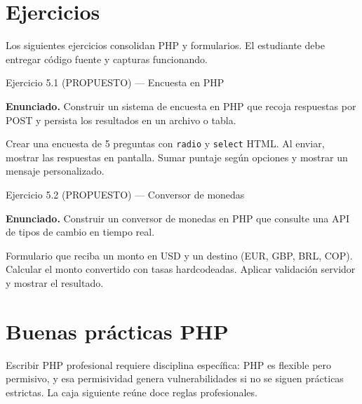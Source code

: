 \documentclass[11pt,a4paper,openany]{book}
\begin{document}
\section{Ejercicios}

Los siguientes ejercicios consolidan PHP y formularios.
El estudiante debe entregar código fuente y capturas funcionando.


\begin{cajaejercicio}{Ejercicio 5.1 (PROPUESTO) --- Encuesta en PHP}


\textbf{Enunciado.} Construir un sistema de encuesta en PHP que recoja respuestas por POST y persista los resultados en un archivo o tabla.

Crear una encuesta de 5 preguntas con \texttt{radio} y \texttt{select}
HTML. Al enviar, mostrar las respuestas en pantalla. Sumar puntaje
según opciones y mostrar un mensaje personalizado.
\end{cajaejercicio}

\begin{cajaejercicio}{Ejercicio 5.2 (PROPUESTO) --- Conversor de monedas}


\textbf{Enunciado.} Construir un conversor de monedas en PHP que consulte una API de tipos de cambio en tiempo real.

Formulario que reciba un monto en USD y un destino (EUR, GBP, BRL,
COP). Calcular el monto convertido con tasas hardcodeadas. Aplicar
validación servidor y mostrar el resultado.
\end{cajaejercicio}

\section{Buenas prácticas PHP}

Escribir PHP profesional requiere disciplina específica:
PHP es flexible pero permisivo, y esa permisividad genera vulnerabilidades
si no se siguen prácticas estrictas. La caja siguiente reúne doce
reglas profesionales.
\end{document}
